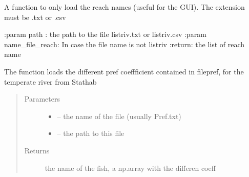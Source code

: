 \documentclass[letterpaper,10pt,english]{sphinxmanual}
\begin{document}

\begin{fulllineitems}
\label{\detokenize{index:src.stathab_c.load_namereach}}
A function to only load the reach names (useful for the GUI). The extension must be .txt or .csv

:param path : the path to the file listriv.txt or listriv.csv
:param name\_file\_reach: In case the file name is not listriv
:return: the list of reach name

\end{fulllineitems}


\begin{fulllineitems}
\label{\detokenize{index:src.stathab_c.load_pref}}
The function loads the different pref coeffficient contained in filepref, for the temperate river from Stathab
\begin{quote}\begin{description}
\item[{Parameters}] \leavevmode\begin{itemize}
\item {} 
 -- the name of the file (usually Pref.txt)

\item {} 
 -- the path to this file

\end{itemize}

\item[{Returns}] \leavevmode
the name of the fish, a np.array with the differen coeff

\end{description}\end{quote}

\end{fulllineitems}

\end{document}
